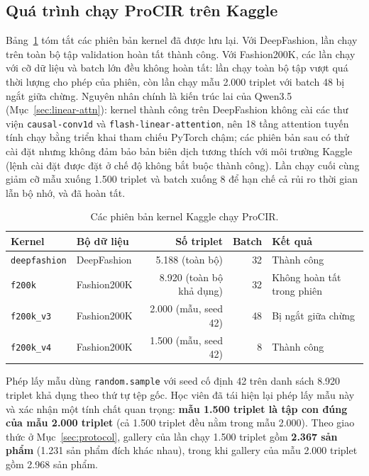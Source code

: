 \subsection{Quá trình chạy ProCIR trên Kaggle}

Bảng~\ref{tab:kaggle-runs} tóm tắt các phiên bản kernel đã được lưu lại. Với DeepFashion, lần chạy trên toàn bộ tập validation hoàn tất thành công. Với Fashion200K, các lần chạy với cỡ dữ liệu và batch lớn đều không hoàn tất: lần chạy toàn bộ tập vượt quá thời lượng cho phép của phiên, còn lần chạy mẫu 2.000 triplet với batch 48 bị ngắt giữa chừng. Nguyên nhân chính là kiến trúc lai của Qwen3.5 (Mục~\ref{sec:linear-attn}): kernel thành công trên DeepFashion không cài các thư viện \texttt{causal-conv1d} và \texttt{flash-linear-attention}, nên 18 tầng attention tuyến tính chạy bằng triển khai tham chiếu PyTorch chậm; các phiên bản sau có thử cài đặt nhưng không đảm bảo bản biên dịch tương thích với môi trường Kaggle (lệnh cài đặt được đặt ở chế độ không bắt buộc thành công). Lần chạy cuối cùng giảm cỡ mẫu xuống 1.500 triplet và batch xuống 8 để hạn chế cả rủi ro thời gian lẫn bộ nhớ, và đã hoàn tất.

\begin{table}[h]
\centering
\caption{Các phiên bản kernel Kaggle chạy ProCIR.}
\label{tab:kaggle-runs}
\small
\begin{tabular}{llrrl}
\toprule
Kernel & Bộ dữ liệu & Số triplet & Batch & Kết quả \\
\midrule
\texttt{deepfashion} & DeepFashion & 5.188 (toàn bộ) & 32 & Thành công \\
\texttt{f200k} & Fashion200K & 8.920 (toàn bộ khả dụng) & 32 & Không hoàn tất trong phiên \\
\texttt{f200k\_v3} & Fashion200K & 2.000 (mẫu, seed 42) & 48 & Bị ngắt giữa chừng \\
\texttt{f200k\_v4} & Fashion200K & 1.500 (mẫu, seed 42) & 8 & Thành công \\
\bottomrule
\end{tabular}
\end{table}

Phép lấy mẫu dùng \texttt{random.sample} với seed cố định 42 trên danh sách 8.920 triplet khả dụng theo thứ tự tệp gốc. Học viên đã tái hiện lại phép lấy mẫu này và xác nhận một tính chất quan trọng: \textbf{mẫu 1.500 triplet là tập con đúng của mẫu 2.000 triplet} (cả 1.500 triplet đều nằm trong mẫu 2.000). Theo giao thức ở Mục~\ref{sec:protocol}, gallery của lần chạy 1.500 triplet gồm \textbf{2.367 sản phẩm} (1.231 sản phẩm đích khác nhau), trong khi gallery của mẫu 2.000 triplet gồm 2.968 sản phẩm.

